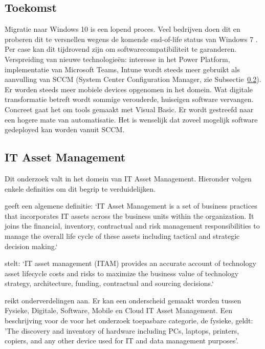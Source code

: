 \subsection{Toekomst}

Migratie naar Windows 10 is een lopend proces. Veel bedrijven doen dit en proberen dit te versnellen wegens de komende end-of-life status van Windows 7 \autocite{MicrosoftSupport2020}. Per case kan dit tijdrovend zijn om softwarecompatibiliteit te garanderen.
Verspreiding van nieuwe technologieën: interesse in het Power Platform, implementatie van Microsoft Teams, Intune wordt steeds meer gebruikt als aanvulling van SCCM (System Center Configuration Manager, zie Subsectie~\ref{subsec:itam}). Er worden steeds meer mobiele devices opgenomen in het domein.
Wat digitale transformatie betreft wordt sommige verouderde, huiseigen software vervangen. Concreet gaat het om tools gemaakt met Visual Basic.
Er wordt gestreefd naar een hogere mate van automatisatie. Het is wenselijk dat zoveel mogelijk software gedeployed kan worden vanuit SCCM.

\subsection{IT Asset Management}
\label{subsec:itam}

Dit onderzoek valt in het domein van IT Asset Management. Hieronder volgen enkele definities om dit begrip te verduidelijken.

\textcite{IAITAM} geeft een algemene definitie: `IT Asset Management is a set of business practices that incorporates IT assets across the business units within the organization. It joins the financial, inventory, contractual and risk management responsibilities to manage the overall life cycle of these assets including tactical and strategic decision making.`

\textcite{Gartner} stelt: `IT asset management (ITAM) provides an accurate account of technology asset lifecycle costs and risks to maximize the business value of technology strategy, architecture, funding, contractual and sourcing decisions.`

\textcite{Ivanti2018} reikt onderverdelingen aan. Er kan een onderscheid gemaakt worden tussen Fysieke, Digitale, Software, Mobile en Cloud IT Asset Management.
Een beschrijving voor de voor het onderzoek toepasbare categorie, de fysieke, geldt: 'The discovery and inventory of hardware including PCs, laptops, printers, copiers, and any other device used for IT and data management purposes'.

